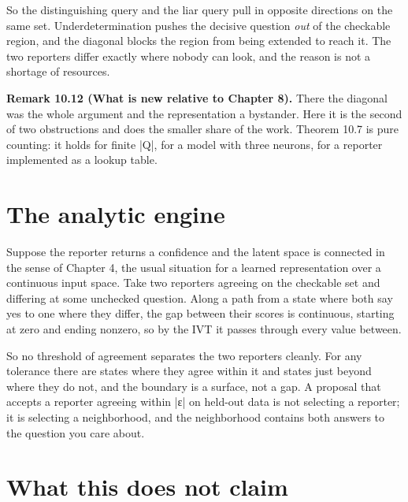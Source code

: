 \documentclass{memoir}
\begin{document}
So the distinguishing query and the liar query pull in opposite directions on
the same set. Underdetermination pushes the decisive question \emph{out} of the
checkable region, and the diagonal blocks the region from being extended to
reach it. The two reporters differ exactly where nobody can look, and the reason
is not a shortage of resources.

\textbf{Remark 10.12 (What is new relative to Chapter 8).} There the diagonal was the whole
argument and the representation a bystander. Here it is the second of two
obstructions and does the smaller share of the work. Theorem 10.7 is pure
counting: it holds for finite \LeanVerb|Q|, for a model with three neurons, for a
reporter implemented as a lookup table.



\section{The analytic engine}\label{Two--Schemas--of--Impossibility-005F-005F-005F--Machine--Checked--Limits--of--Trustworthy--Machine--Learning-005F-005F-005F--and--Why--They--Tighten--with--Capability----The--Reporter--Is--Underdetermined----The--analytic--engine}

Suppose the reporter returns a confidence and the latent space is connected in
the sense of Chapter 4, the usual situation for a learned representation over a
continuous input space. Take two reporters agreeing on the checkable set and
differing at some unchecked question. Along a path from a state where both say
yes to one where they differ, the gap between their scores is continuous,
starting at zero and ending nonzero, so by the IVT it passes through every value
between.

So no threshold of agreement separates the two reporters cleanly. For any
tolerance there are states where they agree within it and states just beyond
where they do not, and the boundary is a surface, not a gap. A proposal that
accepts a reporter agreeing within \LeanVerb|ε| on held-out data is not selecting a
reporter; it is selecting a neighborhood, and the neighborhood contains both
answers to the question you care about.



\section{What this does not claim}\label{Two--Schemas--of--Impossibility-005F-005F-005F--Machine--Checked--Limits--of--Trustworthy--Machine--Learning-005F-005F-005F--and--Why--They--Tighten--with--Capability----The--Reporter--Is--Underdetermined----What--this--does--not--claim}
\end{document}
